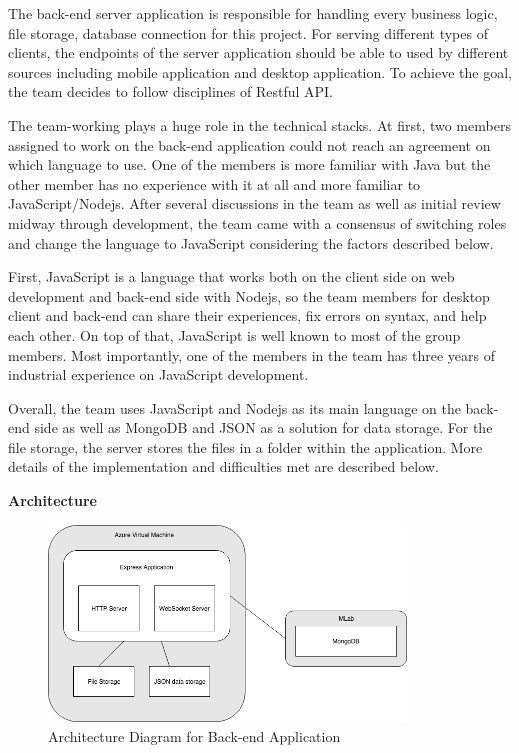 \documentclass{article}
\begin{document}
The back-end server application is responsible for handling every business logic, file storage, database connection for this project. For serving different types of clients, the endpoints of the server application should be able to used by different sources including mobile application and desktop application. To achieve the goal, the team decides to follow disciplines of Restful API.

The team-working plays a huge role in the technical stacks. At first, two members assigned to work on the back-end application could not reach an agreement on which language to use. One of the members is more familiar with Java but the other member has no experience with it at all and more familiar to JavaScript/Nodejs. After several discussions in the team as well as initial review midway through development, the team came with a consensus of switching roles and change the language to JavaScript considering the factors described below. 

First, JavaScript is a language that works both on the client side on web development and back-end side with Nodejs, so the team members for desktop client and back-end can share their experiences, fix errors on syntax, and help each other. On top of that, JavaScript is well known to most of the group members. Most importantly, one of the members in the team has three years of industrial experience on JavaScript development. 

Overall, the team uses JavaScript and Nodejs as its main language on the back-end side as well as MongoDB and JSON as a solution for data storage. For the file storage, the server stores the files in a folder within the application. More details of the implementation and difficulties met are described below.
\newline
\item\textbf{Architecture}\newline

\begin{figure}[H]
\begin{center}
\includegraphics[width=9.5cm]{Backend_Diagram_Archietecture.png}
\end{center}
\caption{Architecture Diagram for Back-end Application}\label{ex4}
\end{figure}
\end{document}
